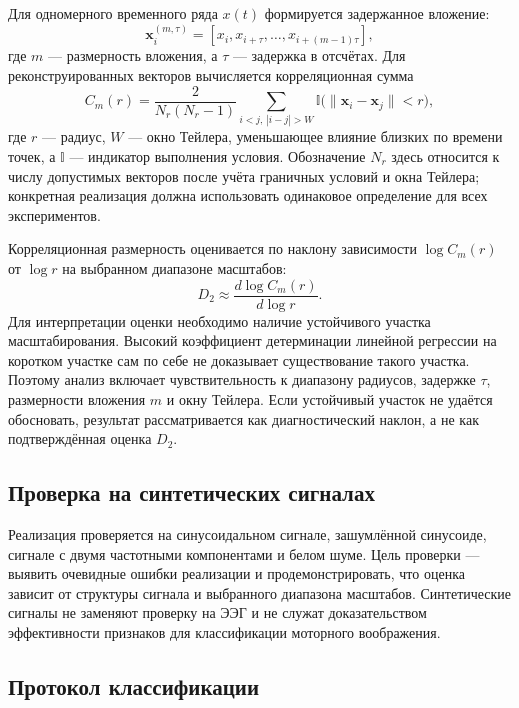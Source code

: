 Для одномерного временного ряда $x(t)$ формируется задержанное вложение:
\begin{equation}
\mathbf{x}_i^{(m,\tau)} = [x_i, x_{i+\tau}, \ldots, x_{i+(m-1)\tau}],
\end{equation}
где $m$ — размерность вложения, а $\tau$ — задержка в отсчётах. Для реконструированных векторов вычисляется корреляционная сумма
\begin{equation}
C_m(r)=\frac{2}{N_r(N_r-1)}\sum_{i<j,\,|i-j|>W}
\mathbb{I}\bigl(\|\mathbf{x}_i-\mathbf{x}_j\|<r\bigr),
\end{equation}
где $r$ — радиус, $W$ — окно Тейлера, уменьшающее влияние близких по времени точек, а $\mathbb{I}$ — индикатор выполнения условия. Обозначение $N_r$ здесь относится к числу допустимых векторов после учёта граничных условий и окна Тейлера; конкретная реализация должна использовать одинаковое определение для всех экспериментов.

Корреляционная размерность оценивается по наклону зависимости $\log C_m(r)$ от $\log r$ на выбранном диапазоне масштабов:
\begin{equation}
D_2 \approx \frac{d\log C_m(r)}{d\log r}.
\end{equation}
Для интерпретации оценки необходимо наличие устойчивого участка масштабирования. Высокий коэффициент детерминации линейной регрессии на коротком участке сам по себе не доказывает существование такого участка. Поэтому анализ включает чувствительность к диапазону радиусов, задержке $\tau$, размерности вложения $m$ и окну Тейлера. Если устойчивый участок не удаётся обосновать, результат рассматривается как диагностический наклон, а не как подтверждённая оценка $D_2$.

\subsection{Проверка на синтетических сигналах}

Реализация проверяется на синусоидальном сигнале, зашумлённой синусоиде, сигнале с двумя частотными компонентами и белом шуме. Цель проверки — выявить очевидные ошибки реализации и продемонстрировать, что оценка зависит от структуры сигнала и выбранного диапазона масштабов. Синтетические сигналы не заменяют проверку на ЭЭГ и не служат доказательством эффективности признаков для классификации моторного воображения.

\subsection{Протокол классификации}

